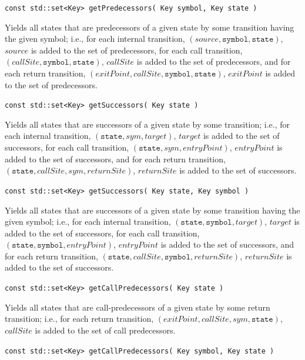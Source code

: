 \documentclass{llncs}
\begin{document}
\begin{description}
  \item\texttt{const std::set<Key> getPredecessors( Key symbol, Key state )} \nopagebreak

    Yields all states that are predecessors of a given state by some
    transition having the given symbol; i.e., for each internal transition,
    $(source,\texttt{symbol},\texttt{state})$, $source$ is added to the set
    of predecessors, for each call transition,
    $(callSite,\texttt{symbol},\texttt{state})$, $callSite$ is added to the
    set of predecessors, and for each return transition,
    $(exitPoint,callSite,\texttt{symbol},\texttt{state})$, $exitPoint$ is
    added to the set of predecessors.

  \item\texttt{const std::set<Key> getSuccessors( Key state )} \nopagebreak

    Yields all states that are successors of a given state by some
    transition; i.e., for each internal transition,
    $(\texttt{state},sym,target)$, $target$ is added to the set of
    successors, for each call transition, $(\texttt{state},sym,entryPoint)$,
    $entryPoint$ is added to the set of successors, and for each return
    transition, $(\texttt{state},callSite,sym,returnSite)$, $returnSite$ is
    added to the set of successors.

  \item\texttt{const std::set<Key> getSuccessors( Key state, Key symbol )} \nopagebreak

    Yields all states that are successors of a given state by some transition
    having the given symbol; i.e., for each internal transition,
    $(\texttt{state},\texttt{symbol},target)$, $target$ is added to the set
    of successors, for each call transition,
    $(\texttt{state},\texttt{symbol},entryPoint)$, $entryPoint$ is added to
    the set of successors, and for each return transition,
    $(\texttt{state},callSite,\texttt{symbol},returnSite)$, $returnSite$ is
    added to the set of successors.

  \item\texttt{const std::set<Key> getCallPredecessors( Key state )} \nopagebreak

    Yields all states that are call-predecessors of a given state by some
    return transition; i.e., for each return transition,
    $(exitPoint,callSite,sym,\texttt{state})$, $callSite$ is added to the set
    of call predecessors.

  \item\texttt{const std::set<Key> getCallPredecessors( Key symbol, Key state )} \nopagebreak


\end{description}
\end{document}
